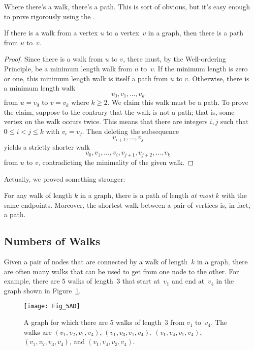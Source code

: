 Where there's a walk, there's a path.  This is sort of obvious, but
it's easy enough to prove rigorously using the .

\begin{lemma}\label{simplepath}
If there is a walk from a vertex $u$ to a vertex~$v$ in a graph, then
there is a path from $u$ to~$v$.
\end{lemma}

\begin{proof}
Since there is a walk from $u$ to $v$, there must, by the
Well-ordering Principle, be a minimum length walk from $u$ to~$v$.  If
the minimum length is zero or one, this minimum length walk is itself
a path from $u$ to $v$.  Otherwise, there is a minimum length walk
\[
v_0, v_1, \dots, v_k
\]
from $u = v_0$ to $v = v_k$ where $k \geq 2$.  We claim this walk must
be a path.  To prove the claim, suppose to the contrary that the walk
is not a path; that is, some vertex on the walk occurs twice.  This
means that there are integers $i,j$ such that $0 \leq i < j \leq k$
with $v_i= v_j$.  Then deleting the subsequence
\[
    v_{i+1}, \dots, v_j
\]
yields a strictly shorter walk
\[
    v_0, v_1,\dots, v_i,v_{j+1},v_{j+2},\dots, v_k
\]
from $u$ to $v$, contradicting the minimality of the given walk.
\end{proof}

Actually, we proved something stronger:
\begin{corollary}\label{ss}
For any walk of length $k$ in a graph, there is a path of length
\emph{at most} $k$ with the same endpoints.  Moreover, the shortest
walk between a pair of vertices is, in fact, a path.
\end{corollary}

\subsection{Numbers of Walks}

Given a pair of nodes that are connected by a walk of length~$k$ in a
graph, there are often many walks that can be used to get from one
node to the other.  For example, there are 5 walks of length~3 that
start at~$v_1$ and end at~$v_4$ in the graph shown in
Figure~\ref{fig:5AD}.

\begin{figure}\redrawn

\texttt{[image: Fig\_5AD]}

\caption{A graph for which there are 5 walks of length~3 from $v_1$
  to~$v_4$.  The walks are $(v_1, v_2, v_1, v_4)$, $(v_1, v_3, v_1,
  v_4)$, $(v_1, v_4, v_1, v_4)$, $(v_1, v_2, v_3, v_4)$, and $(v_1,
  v_4, v_3, v_4)$.}
\label{fig:5AD}
\end{figure}

